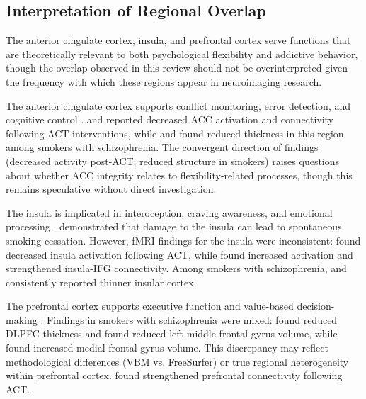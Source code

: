 \documentclass[12pt]{article}
\begin{document}
\subsection{Interpretation of Regional Overlap}

The anterior cingulate cortex, insula, and prefrontal cortex serve functions that are theoretically relevant to both psychological flexibility and addictive behavior, though the overlap observed in this review should not be overinterpreted given the frequency with which these regions appear in neuroimaging research.

The anterior cingulate cortex supports conflict monitoring, error detection, and cognitive control \citep{botvinick2004}. \citet{smallwood2016} and \citet{aytur2021} reported decreased ACC activation and connectivity following ACT interventions, while \citet{jorgensen2015} and \citet{qiu2024} found reduced thickness in this region among smokers with schizophrenia. The convergent direction of findings (decreased activity post-ACT; reduced structure in smokers) raises questions about whether ACC integrity relates to flexibility-related processes, though this remains speculative without direct investigation.

The insula is implicated in interoception, craving awareness, and emotional processing \citep{craig2009, naqvibechara2010}. \citet{naqvi2007} demonstrated that damage to the insula can lead to spontaneous smoking cessation. However, fMRI findings for the insula were inconsistent: \citet{smallwood2016} found decreased insula activation following ACT, while \citet{lee2023} found increased activation and strengthened insula-IFG connectivity. Among smokers with schizophrenia, \citet{jorgensen2015} and \citet{qiu2024} consistently reported thinner insular cortex.

The prefrontal cortex supports executive function and value-based decision-making \citep{millercohen2001}. Findings in smokers with schizophrenia were mixed: \citet{schneider2014} found reduced DLPFC thickness and \citet{yokoyama2018} found reduced left middle frontal gyrus volume, while \citet{tregellas2007} found increased medial frontal gyrus volume. This discrepancy may reflect methodological differences (VBM vs. FreeSurfer) or true regional heterogeneity within prefrontal cortex. \citet{lee2023} found strengthened prefrontal connectivity following ACT.
\end{document}
